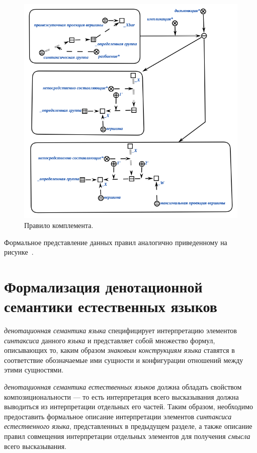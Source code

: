 \begin{figure}[h]
    \centering
    \includegraphics[scale=0.8]{images/part2/chapter_lang/complement_rule}
    \caption{Правило комплемента.}
    \label{fig:complement_rule}
\end{figure}


Формальное представление данных правил аналогично приведенному на рисунке~\textit{}.

\section{Формализация денотационной семантики естественных языков}
\label{section_natural_language_denotational_semantics_formalization}

\textit{денотационная семантика} \textit{языка} специфицирует интерпретацию элементов \textit{синтаксиса} данного \textit{языка} и представляет собой множество формул, описывающих то, каким образом \textit{знаковым конструкциям} \textit{языка} ставятся в соответствие обозначаемые ими сущности и конфигурации отношений между этими сущностями.

\textit{денотационная семантика} \textit{естественных языков} должна обладать свойством композициональности --- то есть интерпретация всего высказывания должна выводиться из интерпретации отдельных его частей.
Таким образом, необходимо предоставить формальное описание интерпретации элементов \textit{синтаксиса} \textit{естественного языка}, представленных в предыдущем разделе, а также описание правил совмещения интерпретации отдельных элементов для получения \textit{смысла} всего высказывания.

